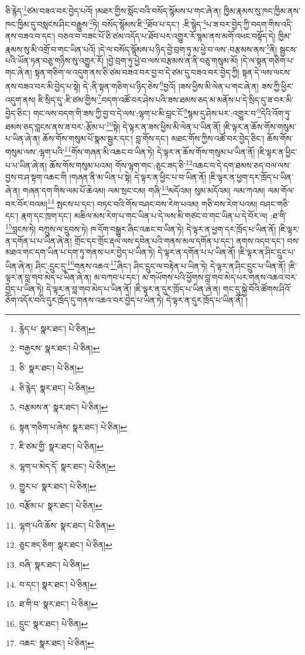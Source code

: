 ཅི་རྙེད་\footnote{རྙེད་པ་  སྣར་ཐང་།  པེ་ཅིན། }ཙམ་བཟའ་བར་བྱེད་པའོ། །མཐར་གྱིས་སློང་བའི་བསོད་སྙོམས་པ་གང་ཞེ་ན། ཁྱིམ་རྣམས་སུ་ཁང་ཁྱིམ་ནས་ཁང་ཁྱིམ་དུ་བསླངས་ཤིང་བརྒྱུས་\footnote{བརྒྱངས་  སྣར་ཐང་།  པེ་ཅིན། }ཏེ། བསོད་སྙོམས་ཇི་\footnote{ཅི་  སྣར་ཐང་།  པེ་ཅིན། }ཐོབ་པ་དང་། :ཇི་སྙེད་\footnote{ཅི་རྙེད་  སྣར་ཐང་།  པེ་ཅིན། }པ་ཟ་བར་བྱེད་ཀྱི་བདག་གིས་འདི་ནས་བཟའ་བ་དང་། བཅའ་བ་བཟང་པོ་ཅི་ཙམ་འདོད་པ་ཐོབ་པར་འགྱུར་རོ་སྙམ་ནས་མགོ་འཕང་བསྟོད་དེ། ཁྱིམ་རྣམས་སུ་མི་འགྲོ་བ་གང་ཡིན་པའོ། །དེ་ལ་བསོད་སྙོམས་པ་ཉིད་བྱེ་བྲག་ཏུ་མ་ཕྱེ་བ་ལས་:བརྩམས་ནས་\footnote{བརྩམས་ན་  སྣར་ཐང་།  པེ་ཅིན། }ནི། སྦྱངས་པའི་ཡོན་ཏན་བཅུ་གཉིས་སུ་འགྱུར་རོ། །བྱེ་བྲག་ཏུ་ཕྱེ་བ་ལས་བརྩམས་ན་ནི་བཅུ་གསུམ་མོ། །དེ་ལ་སྟན་གཅིག་པ་གང་ཞེ་ན། སྟན་གཅིག་ལ་འདུག་ནས་ཅི་ཙམ་བཟའ་བར་བྱ་བ་དེ་ཙམ་དུ་བཟའ་བར་བྱེད་ཀྱི། སྟན་དེ་ལས་ལངས་ནས་བཟའ་བར་མི་བྱེད་པ་སྟེ། དེ་:ནི་སྟན་གཅིག་པ་ཉིད་ཅེས་\footnote{སྟན་གཅིག་པ་ཞེས་  སྣར་ཐང་།  པེ་ཅིན། }བྱའོ། །ཟས་ཕྱིས་མི་ལེན་པ་གང་ཞེ་ན། ཟས་ཀྱི་ཕྱིར་འདུག་ནས། ཇི་སྲིད་དུ་:ཇི་ཙམ་གྱིས་\footnote{ཇི་ཙམ་གྱི་  སྣར་ཐང་།  པེ་ཅིན། }བདག་འཚོ་བར་ཤེས་པའི་ཟས་ཐམས་ཅད་མ་མནོས་པ་དེ་སྲིད་དུ་ཟ་བར་མི་བྱེད་ཅིང་། གང་ལས་བདག་གི་ཟས་ཀྱི་བྱ་བ་དེ་ལས་:ལྷག་པ་མི་བླང་ངོ་\footnote{ལྷག་པ་མེད་དོ་  སྣར་ཐང་།  པེ་ཅིན། }སྙམ་དུ་ཤེས་པར་:འགྱུར་བ་\footnote{གྱུར་པ་  སྣར་ཐང་།  པེ་ཅིན། }དེའི་འོག་ཏུ་ཐམས་ཅད་བླངས་ནས་ཟ་བར་:རྩོམ་པ་\footnote{བརྩོམ་པ་  སྣར་ཐང་།  པེ་ཅིན། }སྟེ། དེ་ལྟར་ན་ཟས་ཕྱིས་མི་ལེན་པ་ཡིན་ནོ། །ཇི་ལྟར་ན་ཆོས་གོས་གསུམ་པ་ཡིན་ཞེ་ན། ཆོས་གོས་གསུམ་པོ་སྣམ་སྦྱར་དང་། བླ་གོས་དང་། མཐང་གོས་ཀྱིས་འཚོ་བར་བྱེད་ཅིང་། ཆོས་གོས་གསུམ་ལས་:ལྷག་པའི་\footnote{ལྷག་པའི་ཆོས་  སྣར་ཐང་།  པེ་ཅིན། }གོས་གཞན་མི་འཆང་བ་ཡིན་ཏེ། དེ་ལྟར་ན་ཆོས་གོས་གསུམ་པ་ཡིན་ནོ། །ཇི་ལྟར་ན་ཕྱིང་པ་པ་ཡིན་ཞེ་ན། ཆོས་གོས་གསུམ་པའམ། གོས་ལྷག་གང་:ཅུང་ཟད་ཅི་\footnote{ཅུང་ཟད་ཅིག་  སྣར་ཐང་།  པེ་ཅིན། }འཆང་བ་དེ་དག་ཐམས་ཅད་བལ་ལས་བྱས་བ་ཤ་སྟག་འཆང་གི །གཞན་ནི་མ་ཡིན་པ་སྟེ། དེ་ལྟར་ན་ཕྱིང་པ་བ་ཡིན་ནོ། །ཇི་ལྟར་ན་ཕྱག་དར་ཁྲོད་པ་ཡིན་ཞེ་ན། གཞན་དག་གིས་ལམ་པོ་ཆེའམ། ལམ་སྲང་ངམ། གཞི་\footnote{བཞི་  སྣར་ཐང་།  པེ་ཅིན། }མདོའམ། སུམ་མདོའམ། ལམ་ཀའམ། ལམ་གོལ་བར་བོར་བའམ།\footnote{བ་དང་།  སྣར་ཐང་།  པེ་ཅིན། } སྤངས་པ་དང་། བཏང་བའི་གོས་བཤང་བས་རེག་པའམ། གཅི་བས་རེག་པའམ། བཤང་གཅི་དང་། རྣག་དང་ཁྲག་དང་། མཆིལ་མས་རེག་པ་གང་ཡིན་པ་དེ་ལས་མི་གཙང་བ་གང་ཡིན་པ་དེ་བོར་ལ། :ཐ་གི་\footnote{ཐ་གི་བ་  སྣར་ཐང་།  པེ་ཅིན། }བླངས་ཏེ། བཀྲུས་ལ་དྲུབས་ཏེ། ཁ་དོག་བསྒྱུར་ཞིང་འཆང་བ་ཡིན་ཏེ། དེ་ལྟར་ན་ཕྱག་དར་ཁྲོད་པ་ཡིན་ནོ། །ཇི་ལྟར་ན་དགོན་པ་པ་ཡིན་ཞེ་ན། གྲོང་དང་གྲོང་རྡལ་ལས་དབེན་པའི་གནས་མལ་དགོན་པ་དང་། ནགས་འདབ་དང་། བས་མཐའ་གང་དག་ཡིན་པ་དག་ཏུ་གནས་པར་བྱེད་པ་ཡིན་ཏེ། དེ་ལྟར་ན་དགོན་པ་པ་ཡིན་ནོ། །ཇི་ལྟར་ན་ཤིང་དྲུང་པ་ཡིན་ཞེ་ན། ཤིང་:དྲུང་དུ་\footnote{དྲུང་  སྣར་ཐང་།  པེ་ཅིན། }གནས་འཆའ་\footnote{འཆང་  སྣར་ཐང་།  པེ་ཅིན། }ཞིང་། ཤིང་དྲུང་ལ་བརྟེན་པ་ཡིན་ཏེ། དེ་ལྟར་ན་ཤིང་དྲུང་པ་ཡིན་ནོ། །ཇི་ལྟར་ན་བླ་གབ་མེད་པ་ཡིན་ཞེ་ན། མ་བཀབ་པ་དང་། མ་གཡོགས་པའི་ཕྱོགས་བླ་གབ་མེད་པར་གནས་འཆའ་བར་བྱེད་པ་ཡིན་ཏེ། དེ་ལྟར་ན་བླ་གབ་མེད་པ་ཡིན་ནོ། །ཇི་ལྟར་ན་དུར་ཁྲོད་པ་ཡིན་ཞེ་ན། གང་དུ་སྐྱེ་བོའི་ཚོགས་ཤིའོ་ཅོག་འདོར་བའི་དུར་ཁྲོད་དུ་གནས་འཆའ་བར་བྱེད་པ་ཡིན་ཏེ། དེ་ལྟར་ན་དུར་ཁྲོད་པ་ཡིན་ནོ། །
